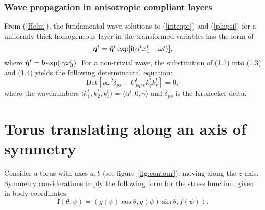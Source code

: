 \documentclass{jfm}
\newcommand\etb{\boldsymbol{\eta}}
\begin{document}
\subsubsection{Wave propagation in anisotropic compliant layers}

From (\ref{Helm}), the fundamental wave solutions to (\ref{inteqpt}) and
(\ref{phipsi}) for a uniformly thick homogeneous layer in the transformed
variables has the form of
\begin{equation}
\etb^t = \skew2\hat{\etb}^t \exp [\mathrm{i} (\alpha^tx^t_1-\omega t)],
\end{equation}
where $\skew2\hat{\etb}^t=\boldsymbol{b}\exp (\mathrm{i}\gamma x^t_3)$. For a
non-trivial wave, the substitution of (1.7) into (1.3) and
(1.4) yields the following determinantal equation:
\begin{equation}
\mbox{Det}[\rho\omega^2\delta_{ps}-C^t_{pqrs}k^t_qk^t_r]=0,
\end{equation}
where the wavenumbers $\langle k^t_1,k^t_2,k^t_3\rangle = \langle
\alpha^t,0,\gamma\rangle $ and $\delta_{ps}$ is the Kronecker delta.


\section{Torus translating along an axis of symmetry}\label{sec:torustrans}

Consider a torus with axes $a,b$ (see figure~\ref{fig:contour}), moving along
the $z$-axis. Symmetry considerations imply the following form for the stress
function, given in body coordinates:
\begin{equation}
\boldsymbol{f}(\theta,\psi) = (g(\psi)\cos \theta,g(\psi) \sin \theta,f(\psi)).
\label{eq41}
\end{equation}
\end{document}
